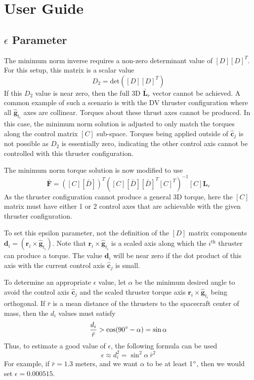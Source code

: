 
\section{User Guide}
\subsection{$\epsilon$ Parameter}
The minimum norm inverse requires a non-zero determinant value of $[D][D]^{T}$.  For this setup, this matrix is a scalar value
\begin{equation}
	D_{2} = \text{det}([D][D]^{T})
\end{equation}
If this $D_{2}$ value is near zero, then the full 3D $\bar{\bm L}_{r}$ vector cannot be achieved.  A common example of such a scenario is with the DV thruster configuration where all $\hat{\bm g}_{t_{i}}$ axes are collinear.  Torques about these thrust axes cannot be produced.  In this case, the minimum norm solution is adjusted to only match the torques along the control matrix $[C]$ sub-space.  Torques being applied outside of $\hat{\bm c}_{j}$ is not possible as $D_{2}$ is essentially zero, indicating the other control axis cannot be controlled with this thruster configuration.  

The minimum norm torque solution is now modified to use
\begin{equation}
	\bar{\bm F} = ([C][\bar D])^{T}( [C][\bar D][\bar D]^{T}[C]^{T})^{-1} [C] {\bm L}_{r}
\end{equation}
As the thruster configuration cannot produce a general 3D torque, here the $[C]$ matrix must have either 1 or 2 control axes that are achievable with the given thruster configuration.  

To set this epsilon parameter, not the definition of the $[D]$ matrix components $\bm d_{i} = (\bm r_{i} \times \hat{\bm g}_{t_{i}})$. Note that $\bm r_{i} \times \hat{\bm g}_{t_{i}}$ is a scaled axis along which the $i^{\text{th}}$ thruster can produce a torque.  The value $\bm d_{i}$ will be near zero if the dot product of this axis with the current control axis $\hat{\bm c}_{j}$ is small.  

To determine an appropriate $\epsilon$ value, let $\alpha$ be the minimum desired angle to avoid the control axis $\hat{\bm c}_{j}$ and the scaled thruster torque axis $\bm r_{i} \times \hat{\bm g}_{t_{i}}$ being orthogonal.  If $\bar r$ is a mean distance of the thrusters to the spacecraft center of mass, then the $d_{i}$ values must satisfy
\begin{equation}
	\frac{d_{i}}{\bar r} > \cos(90\dg - \alpha) = \sin\alpha
\end{equation}
Thus, to estimate a good value of $\epsilon$, the following formula can be used
\begin{equation}
	\epsilon \approx d_{i}^{2} = \sin^{2}\!\alpha \ \bar{r}^{2}
\end{equation}
For example, if $\bar{r} = 1.3$ meters, and we want $\alpha$ to be at least 1$\dg$, then we would set $\epsilon = 0.000515$.

